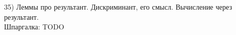 35) Леммы про результант. Дискриминант, его смысл. Вычисление через результант.\\

Шпаргалка: TODO\\
